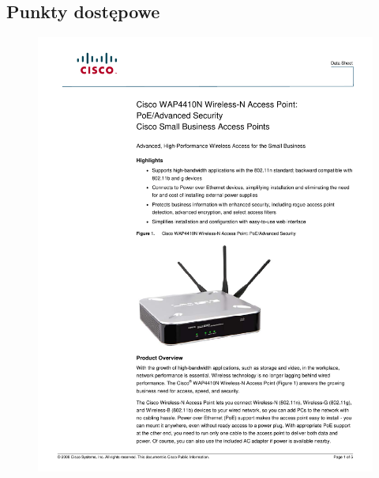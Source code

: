 \documentclass[a4paper, 12pt]{article}
\begin{document}
\subsection{Punkty dostępowe}
\begin{figure}[H]
\centering
    \includegraphics[scale=0.80]{spec/access.pdf}
    \label{fig:PropProf}
\end{figure}
\end{document}
